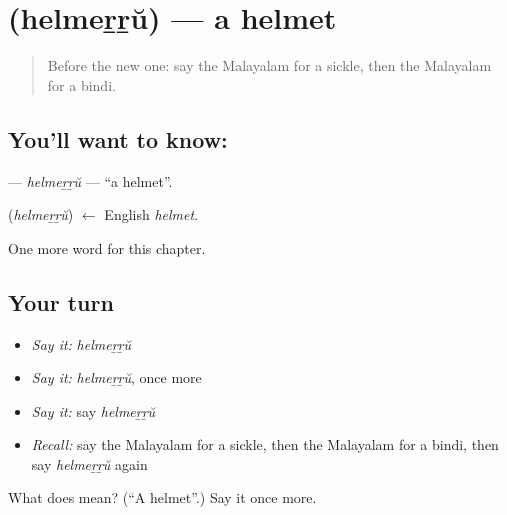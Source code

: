 \section[\texorpdfstring{\ml{ഹെൽമെറ്റ്} (helmeṟṟŭ)}{ഹെൽമെറ്റ് (helmeṟṟŭ)}]{ (helmeṟṟŭ) — a helmet}

\label{lesson:ML-C333-helmerru}



\begin{quote}
Before the new one: say the Malayalam for a sickle, then the Malayalam for a bindi.
\end{quote}

\subsection*{You'll want to know: }
\textbf{} — \emph{helmeṟṟŭ} — \textquotedblleft{}a helmet\textquotedblright{}.

\begin{cousinweb}
\textbf{} (\emph{helmeṟṟŭ}) $\leftarrow$ English \emph{helmet}.
\end{cousinweb}

\begin{grammarlens}[title={What you've built}]
One more word for this chapter.
\end{grammarlens}

\subsection*{Your turn}
\begin{itemize}
\raggedright
  \item \emph{Say it:} \emph{helmeṟṟŭ}
  \item \emph{Say it:} \emph{helmeṟṟŭ}, once more
  \item \emph{Say it:} say \emph{helmeṟṟŭ}
  \item \emph{Recall:} say the Malayalam for a sickle, then the Malayalam for a bindi, then say \emph{helmeṟṟŭ} again
\end{itemize}

\begin{tcolorbox}[breakable,colback=teal!4,colframe=teal!35!black,title={Before you move on}]
What does  mean? (\textquotedblleft{}A helmet\textquotedblright{}.) Say it once more.
\end{tcolorbox}
